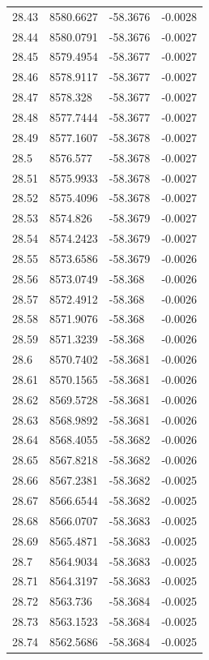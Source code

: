 \begin{table}[H]
\begin{tabular}{llll}
28.43 & 8580.6627 & -58.3676 & -0.0028 \\
28.44 & 8580.0791 & -58.3676 & -0.0027 \\
28.45 & 8579.4954 & -58.3677 & -0.0027 \\
28.46 & 8578.9117 & -58.3677 & -0.0027 \\
28.47 & 8578.328 & -58.3677 & -0.0027 \\
28.48 & 8577.7444 & -58.3677 & -0.0027 \\
28.49 & 8577.1607 & -58.3678 & -0.0027 \\
28.5 & 8576.577 & -58.3678 & -0.0027 \\
28.51 & 8575.9933 & -58.3678 & -0.0027 \\
28.52 & 8575.4096 & -58.3678 & -0.0027 \\
28.53 & 8574.826 & -58.3679 & -0.0027 \\
28.54 & 8574.2423 & -58.3679 & -0.0027 \\
28.55 & 8573.6586 & -58.3679 & -0.0026 \\
28.56 & 8573.0749 & -58.368 & -0.0026 \\
28.57 & 8572.4912 & -58.368 & -0.0026 \\
28.58 & 8571.9076 & -58.368 & -0.0026 \\
28.59 & 8571.3239 & -58.368 & -0.0026 \\
28.6 & 8570.7402 & -58.3681 & -0.0026 \\
28.61 & 8570.1565 & -58.3681 & -0.0026 \\
28.62 & 8569.5728 & -58.3681 & -0.0026 \\
28.63 & 8568.9892 & -58.3681 & -0.0026 \\
28.64 & 8568.4055 & -58.3682 & -0.0026 \\
28.65 & 8567.8218 & -58.3682 & -0.0026 \\
28.66 & 8567.2381 & -58.3682 & -0.0025 \\
28.67 & 8566.6544 & -58.3682 & -0.0025 \\
28.68 & 8566.0707 & -58.3683 & -0.0025 \\
28.69 & 8565.4871 & -58.3683 & -0.0025 \\
28.7 & 8564.9034 & -58.3683 & -0.0025 \\
28.71 & 8564.3197 & -58.3683 & -0.0025 \\
28.72 & 8563.736 & -58.3684 & -0.0025 \\
28.73 & 8563.1523 & -58.3684 & -0.0025 \\
28.74 & 8562.5686 & -58.3684 & -0.0025 \\

\end{tabular}
\end{table}
